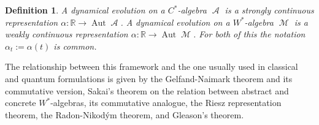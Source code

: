 \documentclass{article}
\DeclareMathOperator{\M}{\mathcal{M}}
\DeclareMathOperator{\A}{\mathcal{A}}
\DeclareMathOperator{\Aut}{Aut}
\newtheorem{definition}{Definition}[section]
\begin{document}
\begin{definition}
	A dynamical evolution on a $C^*$-algebra $\A$ is a strongly continuous representation $\alpha:\mathbb{R}\rightarrow\Aut\A$. A dynamical evolution on a $W^*$-algebra $\M$ is a weakly continuous representation $\alpha:\mathbb{R}\rightarrow\Aut\M$. For both of this the notation $\alpha_t:=\alpha(t)$ is common.
\end{definition} 
The relationship between this framework and the one usually used in classical and quantum formulations is given by the Gelfand-Naimark theorem and its commutative version\cite{Gelfand1943}, Sakai's theorem on the relation between abstract and concrete $W^*$-algebras\cite{Sakai1956}, its commutative analogue, the Riesz representation theorem\cite{Riesz1909, Kukutani1941}, the Radon-Nikod\'ym theorem\cite{Otton1930}, and  Gleason's theorem\cite{Gleason1957}.   
\end{document}

